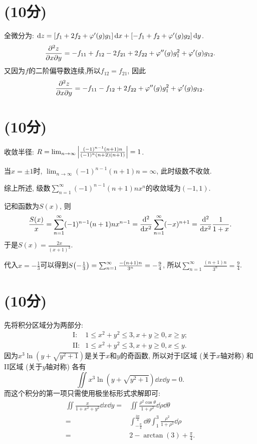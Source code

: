 \documentclass[12pt]{ctexart}
\begin{document}
\section{(10分)}
全微分为: \(\dd{z}=\qty[f_{1}+2f_{2}+\varphi'(g)g_{1}]\dd{x}+\qty[-f_{1}+f_{2}+\varphi'(g)g_{2}]\dd{y}\).
\begin{align*}
	\pdv{z}{x}{y}=-f_{11}+f_{12}-2f_{21}+2f_{22}+\varphi''(g)g_{1}^{2}+\varphi'(g)g_{12}.
\end{align*}
又因为\(f\)的二阶偏导数连续,所以\(f_{12}=f_{21}\), 因此
\begin{align*}
	\pdv{z}{x}{y}=-f_{11}-f_{12}+2f_{22}+\varphi''(g)g_{1}^{2}+\varphi'(g)g_{12}.
\end{align*}\par
\section{(10分)}
收敛半径: \(R=\lim_{n\rightarrow\infty}\abs{\frac{(-1)^{n-1}(n+1)n}{(-1)^n(n+2)(n+1)}}=1\).\par
当\(x=\pm1\)时, \(\lim_{n\rightarrow\infty}(-1)^{n-1}(n+1)n=\infty\), 此时级数不收敛.\par
综上所述, 级数\(\sum_{n=1}^{\infty}(-1)^{n-1}(n+1)nx^{n}\)的收敛域为\((-1,1)\).\par
记和函数为\(S(x)\), 则\[\frac{S(x)}{x}=\sum_{n=1}^{\infty}(-1)^{n-1}(n+1)nx^{n-1}=\dv[2]{x}\sum_{n=1}^{\infty}(-x)^{n+1}=\dv[2]{x}\frac{1}{1+x}.\]于是\(S(x)=\frac{2x}{(x+1)^{3}}\).\par
代入\(x=-\frac{1}{3}\)可以得到\(S\qty(-\frac{1}{3})=\sum_{n=1}^{\infty}\frac{-(n+1)n}{3^{n}}=-\frac{9}{4}\), 所以\(\sum_{n=1}^{\infty}\frac{(n+1)n}{3^{n}}=\frac{9}{4}\).\par
\section{(10分)}
先将积分区域分为两部分:
\begin{align*}
	\text{I}:{}&1\le x^{2}+y^{2}\le3, x+y\ge0, x\ge y;\\
	\text{II}:{}&1\le x^{2}+y^{2}\le3, x+y\ge0, x\le y.
\end{align*}
因为\(x^{3}\ln(y+\sqrt{y^{2}+1})\)是关于\(x\)和\(y\)的奇函数, 所以对于I区域 (关于\(x\)轴对称) 和II区域 (关于\(y\)轴对称) 各有\[
	\iint x^{3}\ln(y+\sqrt{y^{2}+1})\dd{x}\dd{y}=0.
\]
而这个积分的第一项只需使用极坐标形式求解即可:
\begin{align*}
	\iint\frac{x}{1+x^{2}+y^{2}}\dd{x}\dd{y}={}&\iint\frac{\rho^{2}\cos{\theta}}{1+\rho^{2}}\dd{\rho}\dd{\theta}\\
	={}&\int_{-\frac{\pi}{4}}^{\frac{3\pi}{4}}\dd{\theta}\int_{1}^{3}\frac{\rho^{2}}{1+\rho^{2}}\dd{\rho}\\
	={}&2-\arctan(3)+\frac{\pi}{4}.
\end{align*}\par
\end{document}
